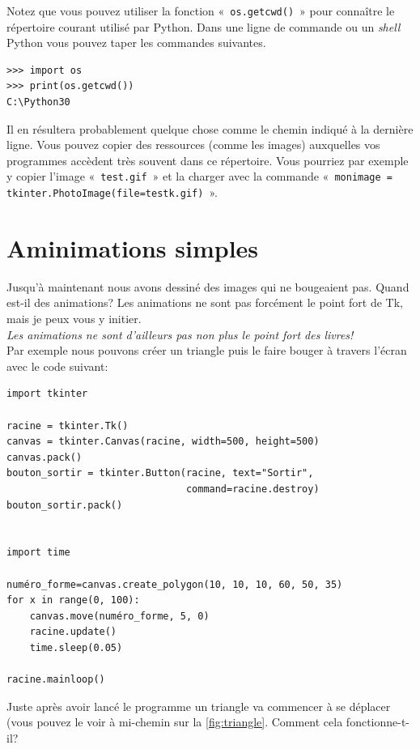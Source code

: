 Notez que vous pouvez utiliser la fonction «~\texttt{os.getcwd()}~» pour connaître le répertoire courant utilisé par Python. Dans une ligne de commande ou un \emph{shell} Python vous pouvez taper les commandes suivantes.
\begin{Verbatim}[frame=single,rulecolor=\color{mbleu}, label=à taper]
>>> import os 
>>> print(os.getcwd())
C:\Python30
\end{Verbatim}

Il en résultera probablement quelque chose comme le chemin indiqué à la dernière ligne. Vous pouvez copier des ressources (comme les images) auxquelles vos programmes accèdent très souvent dans ce répertoire. Vous pourriez par exemple y copier l'image «~\texttt{test.gif}~» et la charger avec la commande «~\texttt{monimage = tkinter.PhotoImage(file=testk.gif)}~».

\section{Aminimations simples}
Jusqu'à maintenant nous avons dessiné des images qui ne bougeaient pas. Quand est-il des animations?
Les animations ne sont pas forcément le point fort de Tk, mais je peux vous y initier.\\

\emph{Les animations ne sont d'ailleurs pas non plus le point fort des livres!}\\

Par exemple nous pouvons créer un triangle puis le faire bouger à travers l'écran avec le code suivant:
\begin{Verbatim}[frame=single,rulecolor=\color{mbleu}, label=à taper]
import tkinter

racine = tkinter.Tk()
canvas = tkinter.Canvas(racine, width=500, height=500)
canvas.pack()
bouton_sortir = tkinter.Button(racine, text="Sortir",
                               command=racine.destroy)
bouton_sortir.pack()


import time

numéro_forme=canvas.create_polygon(10, 10, 10, 60, 50, 35)
for x in range(0, 100):
    canvas.move(numéro_forme, 5, 0)
    racine.update()
    time.sleep(0.05)

racine.mainloop()
\end{Verbatim}

Juste après avoir lancé le programme un triangle va commencer à se déplacer (vous pouvez le voir à mi-chemin sur la \autoref{fig:triangle}. Comment cela fonctionne-t-il?

